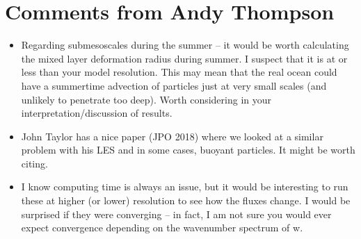 \documentclass[12pt,letter]{article}
\begin{document}
\section{Comments from Andy Thompson}
\begin{itemize}
	\item Regarding submesoscales during the summer -- it would be worth calculating the mixed layer deformation radius during summer.  I suspect that it is at or less than your model resolution.  This may mean that the real ocean could have a summertime advection of particles just at very small scales (and unlikely to penetrate too deep).  Worth considering in your interpretation/discussion of results.

	\item John Taylor has a nice paper (JPO 2018) where we looked at a similar problem with his LES and in some cases, buoyant particles. It might be worth citing.

	\item I know computing time is always an issue, but it would be interesting to run these at higher (or lower) resolution to see how the fluxes change.  I would be surprised if they were converging -- in fact, I am not sure you would ever expect convergence depending on the wavenumber spectrum of w.
\end{itemize}





\end{document}

